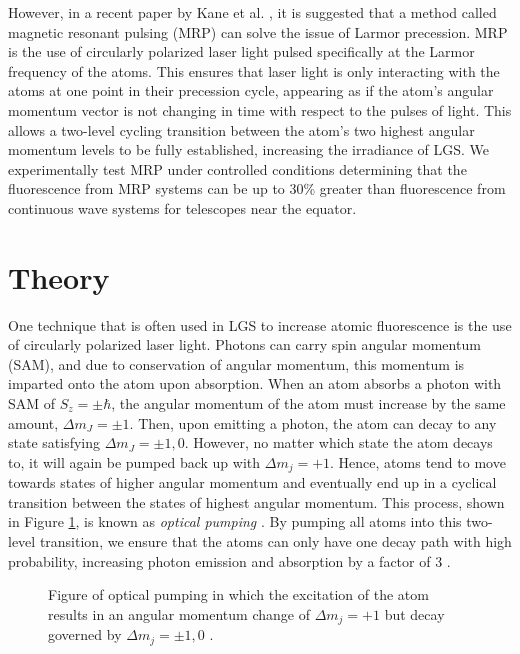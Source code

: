 \documentclass[]{revtex4}
\begin{document}
However, in a recent paper by Kane et al. \cite{Kane2014}, it is suggested that a method called magnetic resonant pulsing (MRP) can solve the issue of Larmor precession. MRP is the use of circularly polarized laser light pulsed specifically at the Larmor frequency of the atoms. This ensures that laser light is only interacting with the atoms at one point in their precession cycle, appearing as if the atom’s angular momentum vector is not changing in time with respect to the pulses of light. This allows a two-level cycling transition between the atom’s two highest angular momentum levels to be fully established, increasing the irradiance of LGS. We experimentally test MRP under controlled conditions determining that the fluorescence from MRP systems can be up to 30\% greater than fluorescence from continuous wave systems for telescopes near the equator.


\section{Theory}

One technique that is often used in LGS to increase atomic fluorescence is the use of circularly polarized laser light. Photons can carry spin angular momentum (SAM), and due to conservation of angular momentum, this momentum is imparted onto the atom upon absorption. When an atom absorbs a photon with SAM of $S_z = \pm \hbar$, the angular momentum of the atom must increase by the same amount, $\Delta m_J = \pm 1$. Then, upon emitting a photon, the atom can decay to any state satisfying $\Delta m_J = \pm 1, 0$. However, no matter which state the atom decays to, it will again be pumped back up with $\Delta m_j = +1$. Hence, atoms tend to move towards states of higher angular momentum and eventually end up in a cyclical transition between the states of highest angular momentum. This process, shown in Figure \ref{fig:opticalpumping}, is known as \textit{optical pumping} \cite{Kane2014}. By pumping all atoms into this two-level transition, we ensure that the atoms can only have one decay path with high probability, increasing photon emission and absorption by a factor of 3 \cite{Kibblewhite2009}.


\begin{figure}[ht]
	\centering
	
	\caption{Figure of optical pumping in which the excitation of the atom results in an angular momentum change of $\Delta m_j = +1$ but decay governed by $\Delta m_j = \pm 1, 0$ \protect\cite{opticalpumping}.}
	\label{fig:opticalpumping}
\end{figure}
\end{document}
